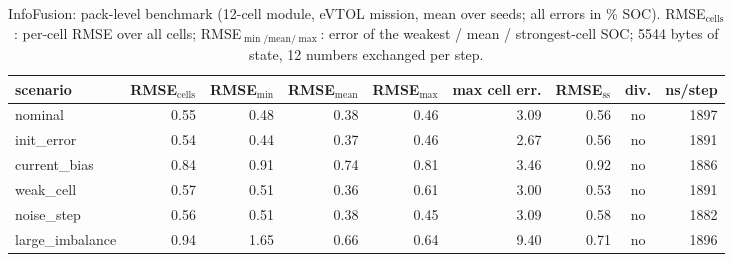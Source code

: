 \begin{table}[H]\centering\footnotesize\setlength{\tabcolsep}{4pt}\caption{InfoFusion: pack-level benchmark (12-cell module, eVTOL mission, mean over seeds; all errors in \% SOC). RMSE$_\mathrm{cells}$: per-cell RMSE over all cells; RMSE$_{\min/\mathrm{mean}/\max}$: error of the weakest / mean / strongest-cell SOC; 5544 bytes of state, 12 numbers exchanged per step.}\label{tab:pack_InfoFusion}
\begin{tabular}{lrrrrrrcr}\toprule scenario & RMSE$_\mathrm{cells}$ & RMSE$_{\min}$ & RMSE$_\mathrm{mean}$ & RMSE$_{\max}$ & max cell err. & RMSE$_\mathrm{ss}$ & div. & ns/step \\ \midrule
nominal & 0.55 & 0.48 & 0.38 & 0.46 & 3.09 & 0.56 & no & 1897 \\
init\_error & 0.54 & 0.44 & 0.37 & 0.46 & 2.67 & 0.56 & no & 1891 \\
current\_bias & 0.84 & 0.91 & 0.74 & 0.81 & 3.46 & 0.92 & no & 1886 \\
weak\_cell & 0.57 & 0.51 & 0.36 & 0.61 & 3.00 & 0.53 & no & 1891 \\
noise\_step & 0.56 & 0.51 & 0.38 & 0.45 & 3.09 & 0.58 & no & 1882 \\
large\_imbalance & 0.94 & 1.65 & 0.66 & 0.64 & 9.40 & 0.71 & no & 1896 \\
\bottomrule\end{tabular}\end{table}
